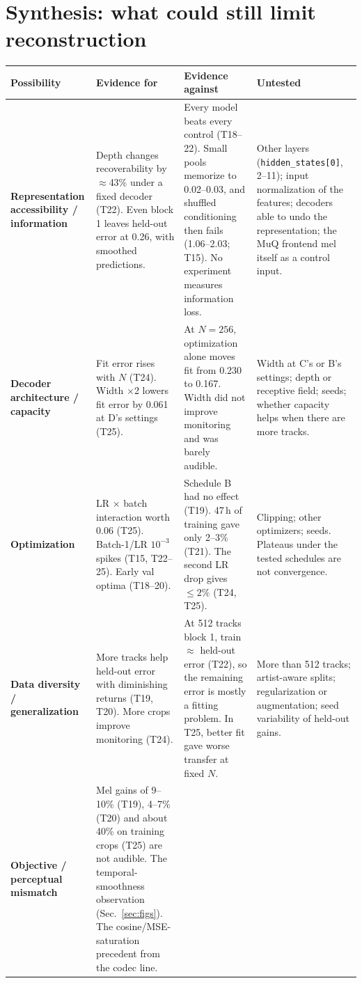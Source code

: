 \documentclass[10pt,letterpaper]{article}
\begin{document}
\section{Synthesis: what could still limit reconstruction}
\label{sec:synthesis}
\begingroup\footnotesize
\setlength{\tabcolsep}{3pt}
\begin{longtable}{@{}L{2.3cm}L{4.8cm}L{4.4cm}L{4.6cm}@{}}
\toprule
Possibility & Evidence for & Evidence against & Untested\\
\midrule\endhead
\textbf{Representation accessibility / information} &
Depth changes recoverability by $\approx$43\% under a fixed decoder (T22). Even block 1 leaves held-out error at 0.26, with smoothed predictions. &
Every model beats every control (T18--22). Small pools memorize to 0.02--0.03, and shuffled conditioning then fails (1.06--2.03; T15). No experiment measures information loss. &
Other layers (\texttt{hidden\_states[0]}, 2--11); input normalization of the features; decoders able to undo the representation; the MuQ frontend mel itself as a control input.\\
\textbf{Decoder architecture / capacity} &
Fit error rises with $N$ (T24). Width $\times$2 lowers fit error by 0.061 at D's settings (T25). &
At $N{=}256$, optimization alone moves fit from 0.230 to 0.167. Width did not improve monitoring and was barely audible. &
Width at C's or B's settings; depth or receptive field; seeds; whether capacity helps when there are more tracks.\\
\textbf{Optimization} &
LR $\times$ batch interaction worth 0.06 (T25). Batch-1/LR $10^{-3}$ spikes (T15, T22--25). Early val optima (T18--20). &
Schedule B had no effect (T19). 47\,h of training gave only 2--3\% (T21). The second LR drop gives $\le2\%$ (T24, T25). &
Clipping; other optimizers; seeds. Plateaus under the tested schedules are not convergence.\\
\textbf{Data diversity / generalization} &
More tracks help held-out error with diminishing returns (T19, T20). More crops improve monitoring (T24). &
At 512 tracks block 1, train $\approx$ held-out error (T22), so the remaining error is mostly a fitting problem. In T25, better fit gave worse transfer at fixed $N$. &
More than 512 tracks; artist-aware splits; regularization or augmentation; seed variability of held-out gains.\\
\textbf{Objective / perceptual mismatch} &
Mel gains of 9--10\% (T19), 4--7\% (T20) and about 40\% on training crops (T25) are not audible. The temporal-smoothness observation (Sec.~\ref{sec:figs}). The cosine/MSE-saturation precedent from the codec line. &

\end{longtable}
\end{document}
